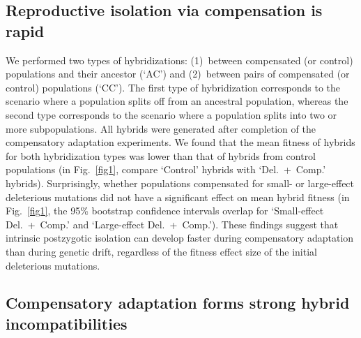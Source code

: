\documentclass{article}
\begin{document}
\subsection*{Reproductive isolation via compensation is rapid}

We performed two types of hybridizations:
(1)~between compensated (or control) populations and their ancestor (`AC')
and (2)~between pairs of compensated (or control) populations (`CC').
%
The first type of hybridization corresponds to the scenario where
a population splits off from an ancestral population,
whereas the second type corresponds to the scenario where
a population splits into two or more subpopulations.
%
All hybrids were generated after completion
of the compensatory adaptation experiments.
%
We found that the mean fitness of hybrids for both hybridization types
was lower than that of hybrids from control populations
(in Fig.~\ref{fig1}, compare `Control' hybrids with `Del.~+~Comp.' hybrids).
%
Surprisingly, whether populations compensated for
small- or large-effect deleterious mutations
did not have a significant effect on mean hybrid fitness
(in Fig.~\ref{fig1}, the 95\% bootstrap confidence intervals overlap for
`Small-effect Del.~+~Comp.' and `Large-effect Del.~+~Comp.').
%
These findings suggest that intrinsic postzygotic isolation
can develop faster during compensatory adaptation than during genetic drift,
regardless of the fitness effect size of the initial deleterious mutations.



\subsection*{Compensatory adaptation forms strong hybrid incompatibilities}
\end{document}

